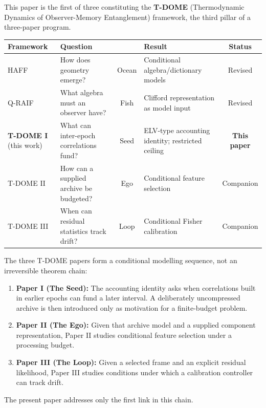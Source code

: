 \documentclass[12pt,a4paper,openany]{book}
\begin{document}
This paper is the first of three constituting the
\textbf{T-DOME} (Thermodynamic Dynamics of Observer-Memory
Entanglement) framework, the third pillar of a three-paper
program.

\begin{center}
\small
\setlength{\tabcolsep}{4pt}%
\begin{tabular}{@{}lP{3.2cm}cP{3.4cm}c@{}}
\toprule
\textbf{Framework} & \textbf{Question} & & \textbf{Result} & \textbf{Status} \\
\midrule
HAFF~\cite{Liu2026HAFF_A,Liu2026HAFF_B}
  & How does geometry emerge?
  & Ocean
  & Conditional algebra/dictionary models
  & Revised \\[3pt]
Q-RAIF~\cite{Liu2026QRAIF_A,Liu2026QRAIF_B}
  & What algebra must an observer have?
  & Fish
  & Clifford representation as model input
  & Revised \\[3pt]
\textbf{T-DOME I} (this work)
  & What can inter-epoch correlations fund?
  & Seed
  & ELV-type accounting identity; restricted ceiling
  & \textbf{This paper} \\[3pt]
T-DOME II
  & How can a supplied archive be budgeted?
  & Ego
  & Conditional feature selection
  & Companion \\[3pt]
T-DOME III
  & When can residual statistics track drift?
  & Loop
  & Conditional Fisher calibration
  & Companion \\
\bottomrule
\end{tabular}
\end{center}

The three T-DOME papers form a conditional modelling sequence,
not an irreversible theorem chain:
\begin{enumerate}
\item \textbf{Paper I (The Seed):} The accounting identity asks when
  correlations built in earlier epochs can fund a later interval.
  A deliberately uncompressed archive is then introduced only as
  motivation for a finite-budget problem.
\item \textbf{Paper II (The Ego):} Given that archive model and a
  supplied component representation, Paper II studies conditional
  feature selection under a processing budget.
\item \textbf{Paper III (The Loop):} Given a selected frame and an
  explicit residual likelihood, Paper III studies conditions under
  which a calibration controller can track drift.
\end{enumerate}

\noindent
The present paper addresses only the first link in this chain.
\end{document}
